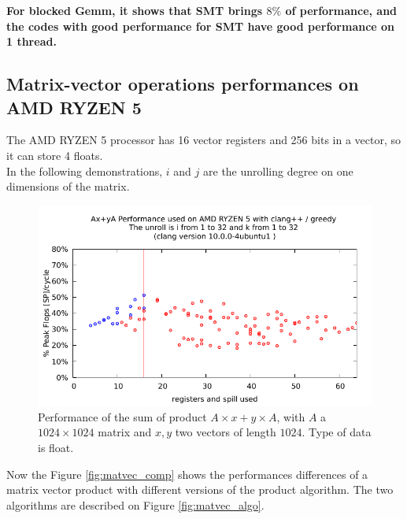 \documentclass{article}
\begin{document}
\textbf{For blocked  Gemm, it shows that SMT brings $8\%$ of performance, and the codes with good performance for SMT have good performance on 1 thread.} 


\subsection{Matrix-vector operations performances on AMD RYZEN 5}

The AMD RYZEN 5 processor has 16 vector registers and 256 bits in a vector, so it can store 4 floats.\\

In the following demonstrations, $i$ and $j$ are the unrolling degree on one dimensions of the matrix. 

\begin{figure}[h!]
  \includegraphics[width=\textwidth]{../autobench/datas/axya/axya_ui_1_32_uk_1_32.pdf}
  \caption{Performance of the sum of product $A\times x+y\times A$, with $A$ a $1024\times1024$ matrix and $x,y$ two vectors of length $1024$. Type of data is float.}
\end{figure}


Now the Figure \ref{fig:matvec_comp} shows the performances differences of a matrix vector product with different versions of the product algorithm. The two algorithms are described on Figure \ref{fig:matvec_algo}.
\end{document}
